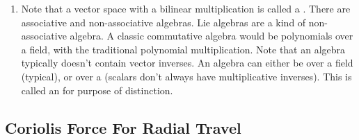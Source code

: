 \begin{enumerate}
  \item Note that a vector space with a bilinear multiplication is
  called a . There are associative and non-associative
  algebras. Lie algebras are a kind of non-associative algebra. A
  classic commutative algebra would be polynomials over a field, with
  the traditional polynomial multiplication. Note that an algebra
  typically doesn't contain vector inverses. An algebra can either be
  over a field (typical), or over a  (scalars don't always
  have multiplicative inverses). This is called an  for purpose of distinction.

\end{enumerate}

\subsection{Coriolis Force For Radial Travel}

